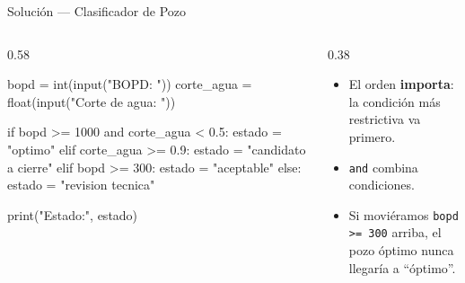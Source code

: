 \documentclass[aspectratio=169, 11pt]{beamer}
\begin{document}
\begin{frame}[fragile,shrink=15]{Solución --- Clasificador de Pozo}
  \vspace{-6pt}
  \begin{columns}[T]
    \begin{column}{0.58\textwidth}
      \begin{pyblock}
bopd = int(input("BOPD: "))
corte_agua = float(input("Corte de agua: "))

if bopd >= 1000 and corte_agua < 0.5:
    estado = "optimo"
elif corte_agua >= 0.9:
    estado = "candidato a cierre"
elif bopd >= 300:
    estado = "aceptable"
else:
    estado = "revision tecnica"

print("Estado:", estado)
      \end{pyblock}
    \end{column}

    \begin{column}{0.38\textwidth}
      {\scriptsize\color{textMuted}
      \begin{itemize}\setlength{\itemsep}{4pt}
        \item[{\color{codeGreen}\scriptsize\faCheck}]
          El orden \textbf{importa}:
          la condición más restrictiva
          va primero.
        \item[{\color{codeGreen}\scriptsize\faCheck}]
          \texttt{and} combina condiciones.
        \item[{\color{arcaRed}\scriptsize\faExclamationTriangle}]
          Si moviéramos \texttt{bopd >= 300}
          arriba, el pozo óptimo
          nunca llegaría a ``óptimo''.
      \end{itemize}
      }
    \end{column}
  \end{columns}
\end{frame}
\end{document}
